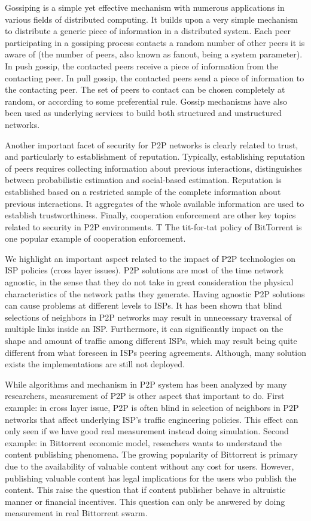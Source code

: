 Gossiping is a simple yet effective mechanism with numerous applications in various fields of distributed computing. 
It builds upon a very simple mechanism to distribute a generic piece of information in a distributed system. 
Each peer participating in a gossiping process contacts a random number of other peers it is aware of (the number of peers, also known as fanout, being a system parameter). 
In push gossip, the contacted peers receive a piece of information from the contacting peer. 
In pull gossip, the contacted peers send a piece of information to the contacting peer. 
The set of peers to contact can be chosen completely at random, or according to some preferential rule.
Gossip mechanisms have also been used as underlying services to build both structured and unstructured networks. 

Another important facet of security for P2P networks is clearly related to trust, and particularly to establishment of reputation. 
Typically, establishing reputation of peers requires collecting information about previous interactions, distinguishes between probabilistic estimation and social-based estimation. 
Reputation is established based on a restricted sample of the complete information about previous interactions. 
It aggregates of the whole available information are used to establish trustworthiness.
Finally, cooperation enforcement are other key topics related to security in P2P environments. T
The tit-for-tat policy of BitTorrent is one popular example of cooperation enforcement.

We highlight an important aspect related to the impact of P2P technologies on ISP policies (cross layer issues). 
P2P solutions are most of the time network agnostic, in the sense that they do not take in great consideration the physical characteristics of the network paths they generate. 
Having agnostic P2P solutions can cause problems at different levels to ISPs. 
It has been shown that blind selections of neighbors in P2P networks may result in unnecessary traversal of multiple links inside an ISP. 
Furthermore, it can significantly impact on the shape and amount of traffic among different ISPs, which may result being quite different from what foreseen in ISPs peering agreements.
Although, many solution exists the implementations are still not deployed. 

While algorithms and mechanism in P2P system has been analyzed by many researchers, measurement of P2P is other aspect that important to do. 
First example: in cross layer issue, P2P is often blind in selection of neighbors in P2P networks that affect underlying ISP's traffic engineering policies.  
This effect can only seen if we have good real measurement instead doing simulation.
Second example: in Bittorrent economic model, reseachers wants to understand the content publishing phenomena. 
The growing popularity of Bittorrent is primary due to the availability of valuable content without any cost for users.
However, publishing valuable content has legal implications for the users who publish the content.
This raise the question that if content publisher behave in altruistic manner or financial incentives. 
This question can only be answered by doing measurement in real Bittorrent swarm. 


